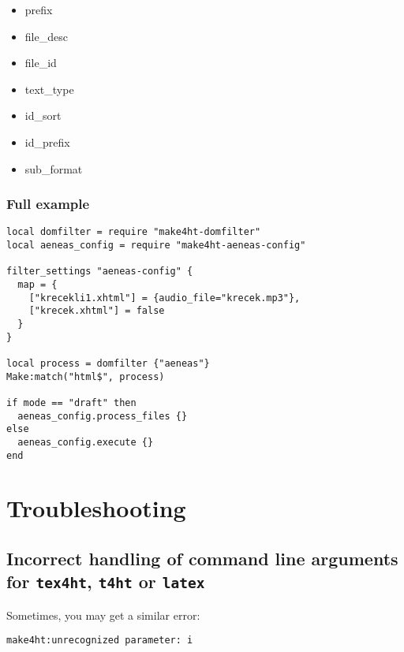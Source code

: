 \begin{itemize}
\tightlist
\item
  prefix
\item
  file\_desc
\item
  file\_id
\item
  text\_type
\item
  id\_sort
\item
  id\_prefix
\item
  sub\_format
\end{itemize}

\hypertarget{full-example}{%
\subsubsection{Full example}\label{full-example}}

\begin{verbatim}
local domfilter = require "make4ht-domfilter"
local aeneas_config = require "make4ht-aeneas-config"

filter_settings "aeneas-config" {
  map = {
    ["krecekli1.xhtml"] = {audio_file="krecek.mp3"}, 
    ["krecek.xhtml"] = false
  }
}

local process = domfilter {"aeneas"}
Make:match("html$", process)

if mode == "draft" then
  aeneas_config.process_files {}
else
  aeneas_config.execute {}
end
\end{verbatim}

\hypertarget{troubleshooting}{%
\section{Troubleshooting}\label{troubleshooting}}

\hypertarget{incorrect-handling-of-command-line-arguments-for-tex4ht-t4ht-or-latex}{%
\subsection{\texorpdfstring{Incorrect handling of command line arguments
for \texttt{tex4ht}, \texttt{t4ht} or
\texttt{latex}}{Incorrect handling of command line arguments for tex4ht, t4ht or latex}}\label{incorrect-handling-of-command-line-arguments-for-tex4ht-t4ht-or-latex}}

Sometimes, you may get a similar error:

\begin{verbatim}
make4ht:unrecognized parameter: i
\end{verbatim}

